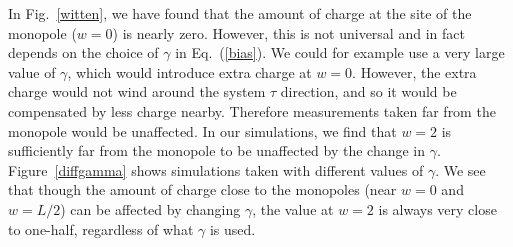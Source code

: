 \documentclass[prb,twocolumn]{revtex4-1}
\newcommand{\scripty}[1]{w}
\begin{document}
In Fig.~\ref{witten}, we have found that the amount of charge at the site of the monopole ($\scripty{r}=0$) is nearly zero. However, this is not universal and in fact depends on the choice of $\gamma$ in Eq.~(\ref{bias}). We could for example use a very large value of $\gamma$, which would introduce extra charge at $\scripty{r}=0$. However, the extra charge would not wind around the system $\tau$ direction, and so it would be compensated by less charge nearby. Therefore measurements taken far from the monopole would be unaffected. In our simulations, we find that $\scripty{r}=2$ is sufficiently far from the monopole to be unaffected by the change in $\gamma$. Figure~\ref{diffgamma} shows simulations taken with different values of $\gamma$. We see that though the amount of charge close to the monopoles (near $\scripty{r}=0$ and $\scripty{r}=L/2$) can be affected by changing $\gamma$, the value at $\scripty{r}=2$ is always very close to one-half, regardless of what $\gamma$ is used.
\end{document}
